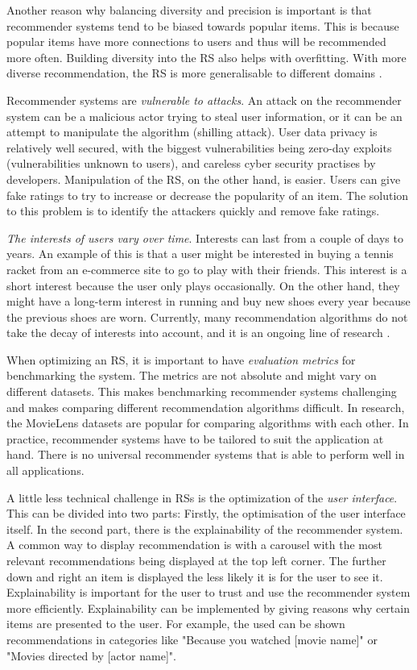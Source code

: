 \documentclass[english, 12pt, a4paper, sci, utf8, a-2b, online]{aaltothesis}
\begin{document}
Another reason why balancing diversity and precision is important is that recommender systems tend to be biased towards popular items. This is because popular items have more connections to users and thus will be recommended more often. Building diversity into the RS also helps with overfitting. With more diverse recommendation, the RS is more generalisable to different domains \parencite{kunaver2017diversity}. 

Recommender systems are \textit{vulnerable to attacks}. An attack on the recommender system can be a malicious actor trying to steal user information, or it can be an attempt to manipulate the algorithm (shilling attack). User data privacy is relatively well secured, with the biggest vulnerabilities being zero-day exploits (vulnerabilities unknown to users), and careless cyber security practises by developers. Manipulation of the RS, on the other hand, is easier. Users can give fake ratings to try to increase or decrease the popularity of an item. The solution to this problem is to identify the attackers quickly and remove fake ratings.

\textit{The interests of users vary over time}. Interests can last from a couple of days to years. An example of this is that a user might be interested in buying a tennis racket from an e-commerce site to go to play with their friends. This interest is a short interest because the user only plays occasionally. On the other hand, they might have a long-term interest in running and buy new shoes every year because the previous shoes are worn. Currently, many recommendation algorithms do not take the decay of interests into account, and it is an ongoing line of research \parencite{lu2012recommender}.

When optimizing an RS, it is important to have \textit{evaluation metrics} for benchmarking the system. The metrics are not absolute and might vary on different datasets. This makes benchmarking recommender systems challenging and makes comparing different recommendation algorithms difficult. In research, the MovieLens datasets are popular for comparing algorithms with each other. In practice, recommender systems have to be tailored to suit the application at hand. There is no universal recommender systems that is able to perform well in all applications. 

A little less technical challenge in RSs is the optimization of the \textit{user interface}. This can be divided into two parts: Firstly, the optimisation of the user interface itself. In the second part, there is the explainability of the recommender system. A common way to display recommendation is with a carousel with the most relevant recommendations being displayed at the top left corner. The further down and right an item is displayed the less likely it is for the user to see it. Explainability is important for the user to trust and use the recommender system more efficiently. Explainability can be implemented by giving reasons why certain items are presented to the user. For example, the used can be shown recommendations in categories like "Because you watched [movie name]" or "Movies directed by [actor name]".
\end{document}
